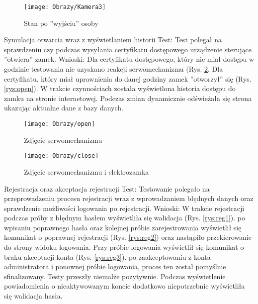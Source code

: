 \documentclass[twoside,10pt]{article}
\begin{document}
\begin{enumerate*}
\begin{figure}[ht!]
\vspace{-1.7cm}
\centering
\texttt{[image: Obrazy/Kamera3]}
\caption{Stan po ''wyjściu'' osoby}
\label{rys:Kamera3}
\end{figure}
\newpage
\item Symulacja otwarcia wraz z wyświetlaniem historii \newline
Test: Test polegał na sprawdzeniu czy podczas wysyłania certyfikatu dostępowego urządzenie sterujące ''otwiera'' zamek. \newline
Wnioski: Dla certyfikatu dostępowego, który nie miał dostępu w godzinie testowania nie uzyskano reakcji serwomechanizmu (Rys. \ref{rys:close}. Dla certyfikatu, który miał uprawnienia do danej godziny zamek ''otworzył'' się (Rys. \ref{rys:open}). W trakcie  czynnościach została wyświetlona historia dostępu do zamku na stronie internetowej. Podczas zmian dynamicznie odświeżała się strona ukazując aktualne dane z bazy danych. 
\begin{figure}[ht!]
\centering
\begin{minipage}{0.5\textwidth}
\texttt{[image: Obrazy/open]}
\caption{Zdjęcie serwomechanizmu }
\label{rys:open}
\end{minipage}
\begin{minipage}{0.5\textwidth}
\texttt{[image: Obrazy/close]}
\caption{Zdjęcie serwomechanizmu i elektrozamka }
\label{rys:close}
\end{minipage}
\end{figure}

\item Rejestracja oraz akceptacja rejestracji \newline
Test: Testowanie polegało na przeprowadzeniu procesu rejestracji wraz z wprowadzaniem błędnych danych oraz sprawdzenie możliwości logowania po rejestracji. \newline
Wnioski: W trakcie rejestracji podczas próby z błędnym hasłem wyświetliła się walidacja (Rys. \ref{rys:reg1}). po wpisaniu poprawnego hasła oraz kolejnej próbie zarejestrowania wyświetlił się komunikat o poprawnej rejestracji (Rys. \ref{rys:reg2}) oraz nastąpiło przekierowanie do strony widoku logowania. Przy próbie logowania wyświetlił się komunikat o braku akceptacji konta (Rys. \ref{rys:reg3}). po zaakceptowaniu z konta administratora i ponownej próbie logowania, proces ten został pomyślnie sfinalizowany. Testy przeszły niemalże pozytywnie. Podczas wyświetlenie powiadomienia o nieaktywowanym koncie dodatkowo niepotrzebnie wyświetliła się walidacja hasła.   


\end{enumerate*}
\end{document}
